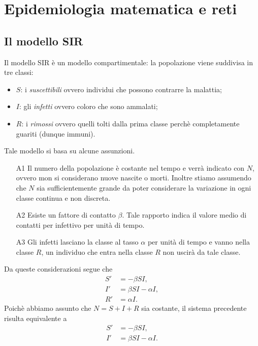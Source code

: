 \chapter{Epidemiologia matematica e reti}
\section{Il modello SIR}{\label{modellosir}}
Il modello SIR \`e un modello compartimentale: la popolazione  viene suddivisa in tre classi: \begin{itemize}
	\item $S$: i \textit{suscettibili}  ovvero individui che possono contrarre la malattia;
	\item $I$: gli \textit{infetti} ovvero coloro che sono ammalati;
	\item $R$: i \textit{rimossi} ovvero  quelli tolti dalla prima classe perch\`e completamente guariti (dunque immuni).
	\end{itemize}
	Tale modello si basa su alcune assunzioni.
	\begin{itemize}
		\item[A1] Il numero della popolazione \`e costante nel tempo e verr\`a indicato con $N$, ovvero mon si considerano nuove nascite o morti. Inoltre stiamo assumendo che $N$ sia sufficientemente grande da poter considerare la variazione in ogni classe continua e non discreta.

\item[A2] Esiste un fattore di contatto  $\beta$. Tale rapporto indica il valore medio di contatti per infettivo per unit\`a di tempo.
		\item[A3] Gli infetti lasciano la classe al tasso $\alpha$ per unit\`a di tempo e vanno nella classe $R$, un individuo che entra nella classe $R$ non uscir\`a da tale classe.
	\end{itemize}
Da queste considerazioni segue che 
\begin{equation}
\label{SIR}
\begin{aligned}
  S'&=-\beta S I,\\
  I'&= \beta S I -\alpha I,\\
  R'&=\alpha I.
\end{aligned}
\end{equation}
Poich\`e abbiamo assunto che $N=S+I+R$ sia costante, il sistema precedente risulta equivalente a 
\begin{equation}
\label{SI}
\begin{aligned}
  S'&=-\beta S I,\\
  I'&= \beta S I -\alpha I.
\end{aligned}
\end{equation}\\ 
